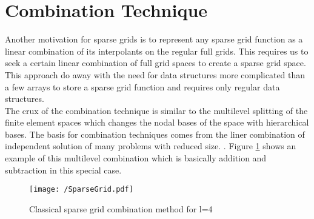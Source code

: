 \section{Combination Technique}
Another motivation for sparse grids is to represent any sparse grid function as a linear combination of its interpolants on the regular full grids. This requires us to seek a certain linear combination of full grid spaces to create a sparse grid space. This approach do away with the need for data structures more complicated than a few arrays to store a sparse grid function and requires only regular data structures.\cite{Griebel1992b} \\
The crux of the combination technique is similar to the multilevel splitting of the finite element spaces which changes the nodal bases of the space with hierarchical bases. \cite{Yserentant1986} The basis for combination techniques comes from the liner combination of independent solution of many problems with reduced size. \cite{Griebel1992}. Figure \ref{fig:Sparsegrid} shows an example of this multilevel combination which is basically addition and subtraction in this special case.

		\begin{figure}
			\centering
			\texttt{[image: /SparseGrid.pdf]}
			\caption{Classical sparse grid combination method for l=4}
			\label{fig:Sparsegrid}
		\end{figure}

